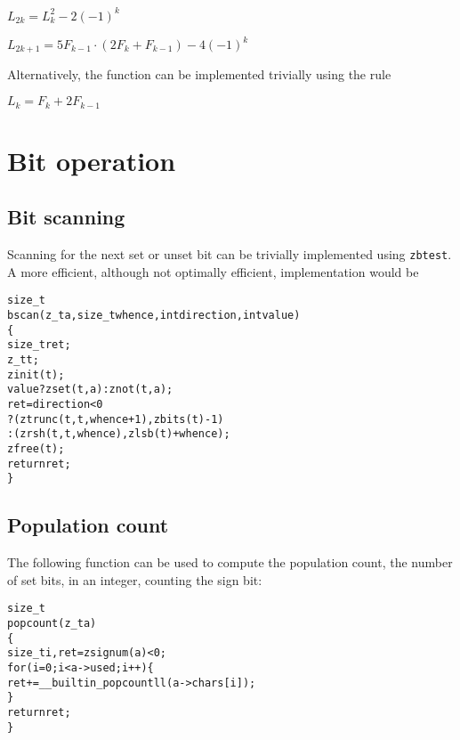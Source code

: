 \vspace{1em}
\( \displaystyle{
    L_{2k} = L_k^2 - 2(-1)^k
}\)
\vspace{1ex}

\( \displaystyle{
    L_{2k + 1} = 5F_{k - 1} \cdot (2F_k + F_{k - 1}) - 4(-1)^k
}\)
\vspace{1em}

\noindent
Alternatively, the function can be implemented
trivially using the rule

\vspace{1em}
\( \displaystyle{
    L_k = F_k + 2F_{k - 1}
}\)


\newpage
\section{Bit operation}
\label{sec:Bit operation unimplemented}

\subsection{Bit scanning}
\label{sec:Bit scanning}

Scanning for the next set or unset bit can be
trivially implemented using {\tt zbtest}. A
more efficient, although not optimally efficient,
implementation would be

\begin{alltt}
   size_t
   bscan(z_t a, size_t whence, int direction, int value)
   \{
       size_t ret;
       z_t t;
       zinit(t);
       value ? zset(t, a) : znot(t, a);
       ret = direction < 0
           ? (ztrunc(t, t, whence + 1), zbits(t) - 1)
           : (zrsh(t, t, whence), zlsb(t) + whence);
       zfree(t);
       return ret;
   \}
\end{alltt}


\subsection{Population count}
\label{sec:Population count}

The following function can be used to compute
the population count, the number of set bits,
in an integer, counting the sign bit:

\begin{alltt}
   size_t
   popcount(z_t a)
   \{
       size_t i, ret = zsignum(a) < 0;
       for (i = 0; i < a->used; i++) \{
           ret += __builtin_popcountll(a->chars[i]);
       \}
       return ret;
   \}
\end{alltt}


